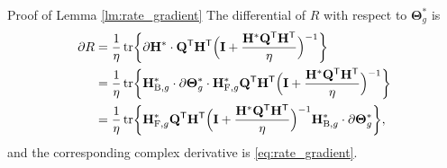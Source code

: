 \documentclass[journal]{IEEEtran}
\DeclareMathOperator{\tr}{tr}
\begin{document}
\begin{appendix}
	\begin{subsection}{Proof of Lemma \ref{lm:rate_gradient}}\label{ap:rate_gradient}
		The differential of $R$ with respect to $\mathbf{\Theta}_g^*$ is \cite{Hjorungnes2007}
		\begin{align*}
			\partial R
			 & = \frac{1}{\eta} \tr \biggl\{ \partial \mathbf{H}^* \cdot \mathbf{Q}^\mathsf{T} \mathbf{H}^\mathsf{T} \Bigl(\mathbf{I} + \frac{\mathbf{H}^* \mathbf{Q}^\mathsf{T} \mathbf{H}^\mathsf{T}}{\eta}\Bigr)^{-1} \biggr\}                                                                      \\
			 & = \frac{1}{\eta} \tr \biggl\{ \mathbf{H}_{\mathrm{B},g}^* \cdot \partial \mathbf{\Theta}_g^* \cdot \mathbf{H}_{\mathrm{F},g}^* \mathbf{Q}^\mathsf{T} \mathbf{H}^\mathsf{T} \Bigl(\mathbf{I} + \frac{\mathbf{H}^* \mathbf{Q}^\mathsf{T} \mathbf{H}^\mathsf{T}}{\eta}\Bigr)^{-1} \biggr\} \\
			 & = \frac{1}{\eta} \tr \biggl\{ \mathbf{H}_{\mathrm{F},g}^* \mathbf{Q}^\mathsf{T} \mathbf{H}^\mathsf{T} \Bigl(\mathbf{I} + \frac{\mathbf{H}^* \mathbf{Q}^\mathsf{T} \mathbf{H}^\mathsf{T}}{\eta}\Bigr)^{-1} \mathbf{H}_{\mathrm{B},g}^* \cdot \partial \mathbf{\Theta}_g^* \biggr\},
		\end{align*}
		and the corresponding complex derivative is \eqref{eq:rate_gradient}.
	\end{subsection}

\end{appendix}
\end{document}

